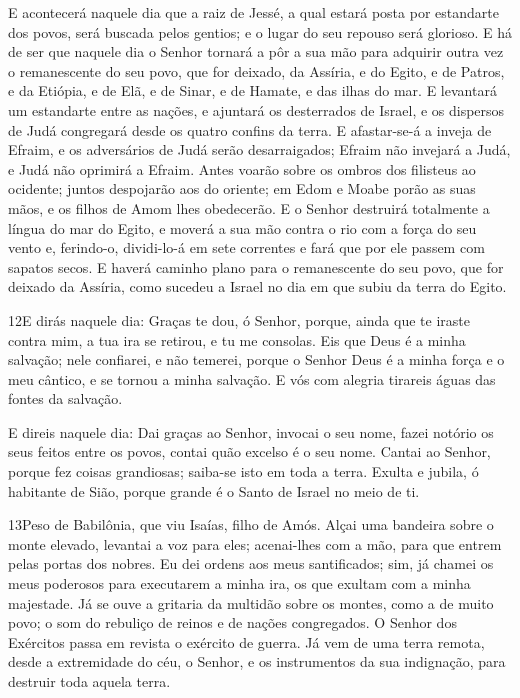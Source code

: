 E acontecerá naquele dia que a raiz de Jessé, a qual estará posta
por estandarte dos povos, será buscada pelos gentios; e o lugar do
seu repouso será glorioso. E há de ser que naquele dia o
Senhor tornará a pôr a sua mão para adquirir outra vez o
remanescente do seu povo, que for deixado, da Assíria, e do Egito, e
de Patros, e da Etiópia, e de Elã, e de Sinar, e de Hamate, e das
ilhas do mar. E levantará um estandarte entre as nações, e
ajuntará os desterrados de Israel, e os dispersos de Judá congregará
desde os quatro confins da terra. E afastar-se-á a inveja de
Efraim, e os adversários de Judá serão desarraigados; Efraim não
invejará a Judá, e Judá não oprimirá a Efraim. Antes voarão
sobre os ombros dos filisteus ao ocidente; juntos despojarão aos do
oriente; em Edom e Moabe porão as suas mãos, e os filhos de Amom
lhes obedecerão. E o Senhor destruirá totalmente a língua do
mar do Egito, e moverá a sua mão contra o rio com a força do seu
vento e, ferindo-o, dividi-lo-á em sete correntes e fará que por ele
passem com sapatos secos. E haverá caminho plano para o
remanescente do seu povo, que for deixado da Assíria, como sucedeu a
Israel no dia em que subiu da terra do Egito.

\medskip

\lettrine{12}{}E dirás naquele dia: Graças te dou, ó Senhor,
porque, ainda que te iraste contra mim, a tua ira se retirou, e tu
me consolas. Eis que Deus é a minha salvação; nele confiarei, e
não temerei, porque o Senhor Deus é a minha força e o meu cântico, e
se tornou a minha salvação. E vós com alegria tirareis águas das
fontes da salvação.

E direis naquele dia: Dai graças ao Senhor, invocai o seu nome,
fazei notório os seus feitos entre os povos, contai quão excelso é o
seu nome. Cantai ao Senhor, porque fez coisas grandiosas;
saiba-se isto em toda a terra. Exulta e jubila, ó habitante de
Sião, porque grande é o Santo de Israel no meio de ti.

\medskip

\lettrine{13}{}Peso de Babilônia, que viu Isaías, filho de
Amós. Alçai uma bandeira sobre o monte elevado, levantai a voz
para eles; acenai-lhes com a mão, para que entrem pelas portas dos
nobres. Eu dei ordens aos meus santificados; sim, já chamei os
meus poderosos para executarem a minha ira, os que exultam com a
minha majestade. Já se ouve a gritaria da multidão sobre os
montes, como a de muito povo; o som do rebuliço de reinos e de
nações congregados. O Senhor dos Exércitos passa em revista o
exército de guerra. Já vem de uma terra remota, desde a
extremidade do céu, o Senhor, e os instrumentos da sua indignação,
para destruir toda aquela terra.


